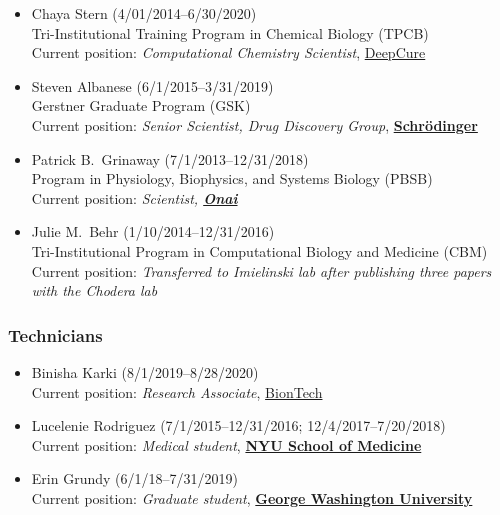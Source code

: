 \documentclass[10pt]{article}
\begin{document}
\begin{itemize}
  \item Chaya Stern (4/01/2014--6/30/2020)\\
  Tri-Institutional Training Program in Chemical Biology (TPCB)\\
  Current position: \emph{Computational Chemistry Scientist},  \href{http://deepcure.ai}{DeepCure}
 
  \item Steven Albanese (6/1/2015--3/31/2019)\\
  Gerstner Graduate Program (GSK)\\
  Current position: \emph{Senior Scientist, Drug Discovery Group},  \href{http://www.schrodinger.com}{{\bf Schr\"{o}dinger}}
  
  \item Patrick B.~Grinaway (7/1/2013--12/31/2018)\\
  Program in Physiology, Biophysics, and Systems Biology (PBSB)\\
  Current position: \emph{Scientist, \href{https://www.onai.com}{\bf Onai}}

  \item Julie M.~Behr (1/10/2014--12/31/2016)\\
  Tri-Institutional Program in Computational Biology and Medicine (CBM)\\
  Current position: \emph{Transferred to Imielinski lab after publishing three papers with the Chodera lab} 

\end{itemize}
  
\subsubsection*{Technicians}

\begin{itemize}
  \item Binisha Karki (8/1/2019--8/28/2020)\\
  Current position: \emph{Research Associate}, \href{http://biontech.de}{BionTech}

  \item Lucelenie Rodriguez (7/1/2015--12/31/2016; 12/4/2017--7/20/2018)\\
  Current position: \emph{Medical student}, \href{https://med.nyu.edu/education}{\bf NYU School of Medicine}

  \item Erin Grundy (6/1/18--7/31/2019)\\
  Current position: \emph{Graduate student}, \href{https://smhs.gwu.edu/ibs/program/microbio-immunology}{\bf George Washington University}
\end{itemize}
\end{document}
